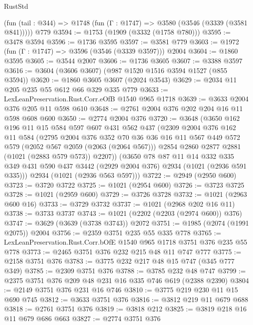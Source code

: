 \begin{lexlean}{RustStd}
\begin{coremodule}
    (fun (tail : @344) => @1748 (fun (Γ : @1747) => @3580 (@3546 (@3339 (@3581 @841)))))
    @779
@3594 := @1753 (@1909 (@3332 (@1758 @780)))
@3595 := @3478 @3594
@3596 := @1736 @3595
@3597 := @3581 @779
@3603 := @1972 (fun (Γ : @1747) => @3596 (@3546 (@3339 @3597))) @2004
@3604 := @1860 @3595
@3605 := @3544 @2007
@3606 := @1736 @3605
@3607 := @3388 @3597
@3616 := @3604 (@3606 @3607) (@987 @1520 @1516 @3594 @1527 (@855 @3594))
@3620 := @1860 @3605 @3607 (@2024 @3543)
@3629 := @2034 @11 @205 @235 @55 @612 @66 @329 @335 @779
@3633 := LexLeanPreservation.Rust.Corr.eOfB @1540 @965 @1718
@3639 := @3633 @2004 @376 @205 @11 @598 @610
@3648 := @2761 @2004 @376 @202 @204 @16 @11 @598 @608 @600
@3650 := @2774 @2004 @376
@3720 := @3648
    (@3650
      @162
      @196
      @11
      @15
      @584
      @597
      @607
      @431
      @562
      @437
      (@2309
        @2004
        @376
        @162
        @11
        @584
        (@2795
          @2004
          @376
          @352
          @70
          @36
          @36
          @16
          @11
          @567
          @449
          @572
          @579
          (@2052 @567 @2059 (@2063 (@2064 @567)))
          @2854
          @2860
          @2877
          @2881
          (@1021 (@2883 @579 @573))
          @2207))
      (@3650
        @78
        @87
        @11
        @14
        @332
        @335
        @349
        @431
        @590
        @437
        @3442
        (@2929 @2004 @376)
        @2934
        (@1021 (@2936 @591 @335)))
      @2934
      (@1021 (@2936 @563 @597)))
@3722 := @2949 (@2950 @600)
@3723 := @3720 @3722
@3725 := @1021 (@2954 @600)
@3726 := @3723 @3725
@3728 := @1021 (@2959 @600)
@3729 := @3726 @3728
@3732 := @1021 (@2963 @600 @16)
@3733 := @3729 @3732
@3737 := @1021 (@2968 @202 @16 @11)
@3738 := @3733 @3737
@3743 := @1021 (@2202 (@2203 (@2974 @600)) @376)
@3747 := @3629 (@3639 (@3738 @3743)) @2072
@3751 := @1985 (@2074 (@1991 @2075)) @2004
@3756 := @2359 @3751 @235 @55 @335 @778
@3765 := LexLeanPreservation.Rust.Corr.bOfE @1540 @965 @1718 @3751 @376 @235 @55 @778
@3773 := @2465 @3751 @376 @232 @215 @48 @11 @747 @777
@3775 := @2158 @3751 @376
@3783 := @3775 @232 @217 @48 @15 @747 (@345 @777 @349)
@3785 := @2309 @3751 @376
@3788 := @3785 @232 @48 @747
@3799 := @2375 @3751 @376 @209 @48 @231 @16 @335 @746 @619 (@2388 @2390)
@3804 := @2149 @3751 @376 @231 @16 @746
@3810 := @3775 @219 @230 @11 @15 @690 @745
@3812 := @3633 @3751 @376
@3816 := @3812 @219 @11 @679 @688
@3818 := @2761 @3751 @376
@3819 := @3818 @212
@3825 := @3819 @218 @16 @11 @679 @686 @663
@3827 := @2774 @3751 @376

\end{coremodule}
\end{lexlean}
